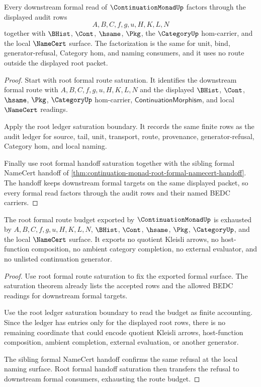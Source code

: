 \begin{theorem}
\label{thm:continuation-monad-root-formal-audit-factorization}
Every downstream formal read of $\ContinuationMonadUp$ factors through the displayed audit rows
$$
A,B,C,f,g,u,H,K,L,N
$$
together with $\BHist$, $\Cont$, $\hsame$, $\Pkg$, the $\CategoryUp$ hom-carrier, and the local $\NameCert$ surface. The factorization is the same for unit, bind, generator-refusal, Category hom, and naming consumers, and it uses no route outside the displayed root packet.
\end{theorem}
\begin{proof}
Start with root formal route saturation. It identifies the downstream formal route with $A,B,C,f,g,u,H,K,L,N$ and the displayed $\BHist$, $\Cont$, $\hsame$, $\Pkg$, $\CategoryUp$ hom-carrier, $\mathsf{ContinuationMorphism}$, and local $\NameCert$ readings.

Apply the root ledger saturation boundary. It records the same finite rows as the audit ledger for source, tail, unit, transport, route, provenance, generator-refusal, Category hom, and local naming.

Finally use root formal handoff saturation together with the sibling formal NameCert handoff of \autoref{thm:continuation-monad-root-formal-namecert-handoff}. The handoff keeps downstream formal targets on the same displayed packet, so every formal read factors through the audit rows and their named BEDC carriers.
\end{proof}

\begin{theorem}
\label{thm:continuation-monad-root-formal-route-budget-exhaustion}
The root formal route budget exported by $\ContinuationMonadUp$ is exhausted by $A,B,C,f,g,u,H,K,L,N$, $\BHist$, $\Cont$, $\hsame$, $\Pkg$, $\CategoryUp$, and the local $\NameCert$ surface. It exports no quotient Kleisli arrows, no host-function composition, no ambient category completion, no external evaluator, and no unlisted continuation generator.
\end{theorem}
\begin{proof}
Use root formal route saturation to fix the exported formal surface. The saturation theorem already lists the accepted rows and the allowed BEDC readings for downstream formal targets.

Use the root ledger saturation boundary to read the budget as finite accounting. Since the ledger has entries only for the displayed root rows, there is no remaining coordinate that could encode quotient Kleisli arrows, host-function composition, ambient completion, external evaluation, or another generator.

The sibling formal NameCert handoff confirms the same refusal at the local naming surface. Root formal handoff saturation then transfers the refusal to downstream formal consumers, exhausting the route budget.
\end{proof}

